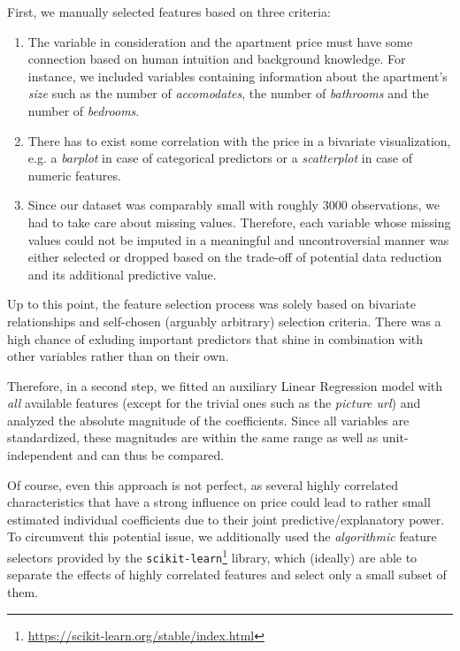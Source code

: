First, we manually selected features based on three criteria:
\begin{enumerate}
    \item The variable in consideration and the apartment price must have some connection based on human intuition and background knowledge. For instance, we included variables containing information about the apartment's \emph{size} such as the number of \emph{accomodates}, the number of \emph{bathrooms} and the number of \emph{bedrooms}.
    \item There has to exist some correlation with the price in a bivariate visualization, e.g. a \emph{barplot} in case of categorical predictors or a \emph{scatterplot} in case of numeric features.
    \item Since our dataset was comparably small with roughly $3000$ observations, we had to take care about missing values.
          Therefore, each variable whose missing values could not be imputed in a meaningful and uncontroversial manner was either selected or dropped based on the trade-off of potential data reduction and its additional predictive value.
\end{enumerate}

Up to this point, the feature selection process was solely based on bivariate relationships and self-chosen (arguably arbitrary) selection criteria.
There was a high chance of exluding important predictors that shine in combination with other variables rather than on their own.

Therefore, in a second step, we fitted an auxiliary Linear Regression model with \emph{all} available features (except for the trivial ones such as the \emph{picture url}) and analyzed the absolute magnitude of the coefficients.
Since all variables are standardized, these magnitudes are within the same range as well as unit-independent and can thus be compared.

Of course, even this approach is not perfect, as several highly correlated characteristics that have a strong influence on price could lead to rather small estimated individual coefficients due to their joint predictive/explanatory power.
To circumvent this potential issue, we additionally used the \emph{algorithmic} feature selectors provided by the \texttt{scikit-learn}\footnote{\url{https://scikit-learn.org/stable/index.html}} library, which (ideally) are able to separate the effects of highly correlated features and select only a small subset of them.

